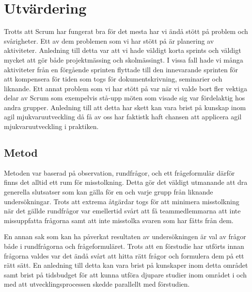 \section{Utvärdering}
Trotts att Scrum har fungerat bra för det mesta har vi ändå stött på problem och svårigheter. Ett av dem problemen som vi har stött på är planering av aktiviteter. Anledning till detta var att vi hade väldigt korta sprints och väldigt mycket att gör både projektmässing och skolmässingt. I vissa fall hade vi många aktiviteter från en förgående sprinten flyttade till den innevarande sprinten för att kompensera för tiden som togs för dokumentskrivning, seminarier och liknande. Ett annat problem som vi har stött på var när vi valde bort fler vektiga delar av Scrum som exempelvis stå-upp möten som visade sig var fördelaktig hos andra grupper. Anledning till att detta har skett kan vara brist på kunskap inom agil mjukvaruutveckling då få av oss har faktistk haft chansen att applicera agil mjukvaruutveckling i praktiken. 

\subsection{Metod}
Metoden var baserad på observation, rundfrågor, och ett frågeformulär därför finns det alltid ett rum för misstolkning. Detta gör det väldigt utmanande att dra generella slutsatser som kan gälla för en och varje grupp från liknande undersökningar. Trots att extrema åtgärdar togs för att minimera misstolkning när det gällde rundfrågor var emellertid svårt att få teammedlemmarna att inte missuppfatta frågorna samt att inte misstolka svaren som har fåtts från dem. 

En annan sak som kan ha påverkat resultaten av undersökningen är val av frågor både i rundfrågorna och frågeformuläret. Trots att en förstudie har utförts innan frågorna valdes var det ändå svårt att hitta rätt frågor och formulera dem på ett rätt sätt. En anledning till detta kan vara brist på kunskaper inom detta området samt brist på tidsbudget för att kunna utföra djupare studier inom området i och med att utvecklingsprocessen skedde parallellt med förstudien. 
